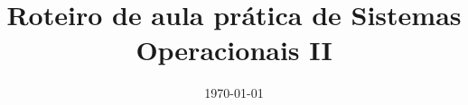 \documentclass[]{article}
\begin{document}
\title{Roteiro de aula prática de Sistemas Operacionais II}

\def\warning{Todos os programas devem ser executados pelo terminal do
  Linux. Qualquer dúvida a respeito da sintaxe de programas disponíveis
  no Linux, execute {\tt man nome\_programa\ \#.}}

\date{\today}









\end{document}
